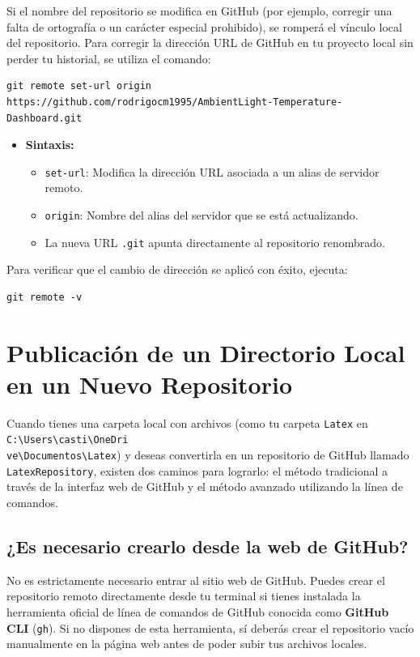 \documentclass[
10pt, %
a4paper, %
oneside, %
headinclude,footinclude, %
BCOR5mm, %
]{scrartcl}
\begin{document}
Si el nombre del repositorio se modifica en GitHub (por ejemplo, corregir una falta de ortografía o un carácter especial prohibido), se romperá el vínculo local del repositorio. Para corregir la dirección URL de GitHub en tu proyecto local sin perder tu historial, se utiliza el comando:

\begin{lstlisting}[language=DOS]
git remote set-url origin https://github.com/rodrigocm1995/AmbientLight-Temperature-Dashboard.git
\end{lstlisting}

\begin{itemize}
	\item \textbf{Sintaxis:}
	\begin{itemize}
		\item \texttt{set-url}: Modifica la dirección URL asociada a un alias de servidor remoto.
		\item \texttt{origin}: Nombre del alias del servidor que se está actualizando.
		\item La nueva URL \texttt{.git} apunta directamente al repositorio renombrado.
	\end{itemize}
\end{itemize}

Para verificar que el cambio de dirección se aplicó con éxito, ejecuta:
\begin{lstlisting}[language=DOS]
git remote -v
\end{lstlisting}

\newpage
\section{Publicación de un Directorio Local en un Nuevo Repositorio}

Cuando tienes una carpeta local con archivos (como tu carpeta \texttt{Latex} en \texttt{C:\textbackslash Users\textbackslash casti\textbackslash OneDri\\ve\textbackslash Documentos\textbackslash Latex}) y deseas convertirla en un repositorio de GitHub llamado \texttt{LatexRepository}, existen dos caminos para lograrlo: el método tradicional a través de la interfaz web de GitHub y el método avanzado utilizando la línea de comandos.

\subsection{¿Es necesario crearlo desde la web de GitHub?}
No es estrictamente necesario entrar al sitio web de GitHub. Puedes crear el repositorio remoto directamente desde tu terminal si tienes instalada la herramienta oficial de línea de comandos de GitHub conocida como \textbf{GitHub CLI} (\texttt{gh}). Si no dispones de esta herramienta, sí deberás crear el repositorio vacío manualmente en la página web antes de poder subir tus archivos locales.
\end{document}
